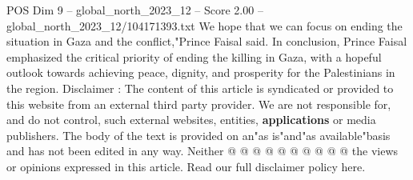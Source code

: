 \begin{textsample}{POS Dim 9 – global\_north\_2023\_12 – Score 2.00 – global\_north\_2023\_12/104171393.txt}
We hope that we can focus on ending the situation in Gaza and the conflict,"Prince Faisal said.
In conclusion, Prince Faisal emphasized the critical priority of ending the killing in Gaza, with a hopeful outlook towards achieving peace, dignity, and prosperity for the Palestinians in the region.
Disclaimer : The content of this article is syndicated or provided to this website from an external third party provider.
We are not responsible for, and do not control, such external websites, entities, \textbf{applications} or media publishers.
The body of the text is provided on an"as is"and"as available"basis and has not been edited in any way.
Neither @ @ @ @ @ @ @ @ @ @ the views or opinions expressed in this article.
Read our full disclaimer policy here.

\end{textsample}
